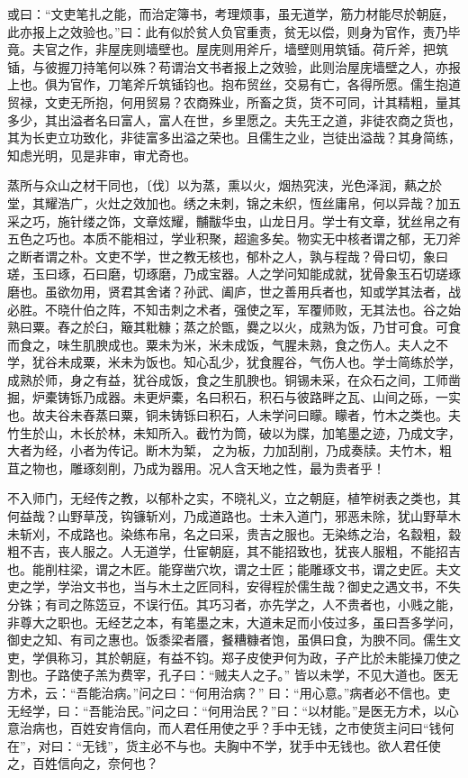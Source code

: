 \documentclass[]{article}
\begin{document}
或曰：``文吏笔扎之能，而治定簿书，考理烦事，虽无道学，筋力材能尽於朝庭，此亦报上之效验也。''曰：此有似於贫人负官重责，贫无以偿，则身为官作，责乃毕竟。夫官之作，非屋庑则墙壁也。屋庑则用斧斤，墙壁则用筑锸。荷斤斧，把筑锸，与彼握刀持笔何以殊？苟谓治文书者报上之效验，此则治屋庑墙壁之人，亦报上也。俱为官作，刀笔斧斤筑锸钧也。抱布贸丝，交易有亡，各得所愿。儒生抱道贸禄，文吏无所抱，何用贸易？农商殊业，所畜之货，货不可同，计其精粗，量其多少，其出溢者名曰富人，富人在世，乡里愿之。夫先王之道，非徒农商之货也，其为长吏立功致化，非徒富多出溢之荣也。且儒生之业，岂徒出溢哉？其身简练，知虑光明，见是非审，审尤奇也。

蒸所与众山之材干同也，〔伐〕以为蒸，熏以火，烟热究浃，光色泽润，爇之於堂，其耀浩广，火灶之效加也。绣之未刺，锦之未织，恆丝庸帛，何以异哉？加五采之巧，施针缕之饰，文章炫耀，黼黻华虫，山龙日月。学士有文章，犹丝帛之有五色之巧也。本质不能相过，学业积聚，超逾多矣。物实无中核者谓之郁，无刀斧之断者谓之朴。文吏不学，世之教无核也，郁朴之人，孰与程哉？骨曰切，象曰瑳，玉曰琢，石曰磨，切琢磨，乃成宝器。人之学问知能成就，犹骨象玉石切瑳琢磨也。虽欲勿用，贤君其舍诸？孙武、阖庐，世之善用兵者也，知或学其法者，战必胜。不晓什伯之阵，不知击刺之术者，强使之军，军覆师败，无其法也。谷之始熟曰粟。舂之於臼，簸其粃糠；蒸之於甑，爨之以火，成熟为饭，乃甘可食。可食而食之，味生肌腴成也。粟未为米，米未成饭，气腥未熟，食之伤人。夫人之不学，犹谷未成粟，米未为饭也。知心乱少，犹食腥谷，气伤人也。学士简练於学，成熟於师，身之有益，犹谷成饭，食之生肌腴也。铜锡未采，在众石之间，工师凿掘，炉橐铸铄乃成器。未更炉橐，名曰积石，积石与彼路畔之瓦、山间之砾，一实也。故夫谷未舂蒸曰粟，铜未铸铄曰积石，人未学问曰矇。矇者，竹木之类也。夫竹生於山，木长於林，未知所入。截竹为筒，破以为牒，加笔墨之迹，乃成文字，大者为经，小者为传记。断木为椠，之为板，力加刮削，乃成奏牍。夫竹木，粗苴之物也，雕琢刻削，乃成为器用。况人含天地之性，最为贵者乎！

不入师门，无经传之教，以郁朴之实，不晓礼义，立之朝庭，植笮树表之类也，其何益哉？山野草茂，钩镰斩刈，乃成道路也。士未入道门，邪恶未除，犹山野草木未斩刈，不成路也。染练布帛，名之曰采，贵吉之服也。无染练之治，名縠粗，縠粗不吉，丧人服之。人无道学，仕宦朝庭，其不能招致也，犹丧人服粗，不能招吉也。能削柱梁，谓之木匠。能穿凿穴坎，谓之士匠；能雕琢文书，谓之史匠。夫文吏之学，学治文书也，当与木土之匠同科，安得程於儒生哉？御史之遇文书，不失分铢；有司之陈笾豆，不误行伍。其巧习者，亦先学之，人不贵者也，小贱之能，非尊大之职也。无经艺之本，有笔墨之末，大道未足而小伎过多，虽曰吾多学问，御史之知、有司之惠也。饭黍梁者餍，餐糟糠者饱，虽俱曰食，为腴不同。儒生文吏，学俱称习，其於朝庭，有益不钧。郑子皮使尹何为政，子产比於未能操刀使之割也。子路使子羔为费宰，孔子曰：``贼夫人之子。''
皆以未学，不见大道也。医无方术，云：``吾能治病。''问之曰：``何用治病？''
曰：``用心意。''病者必不信也。吏无经学，曰：``吾能治民。''问之曰：``何用治民？''曰：``以材能。''是医无方术，以心意治病也，百姓安肯信向，而人君任用使之乎？手中无钱，之市使货主问曰``钱何在''，对曰：``无钱''，货主必不与也。夫胸中不学，犹手中无钱也。欲人君任使之，百姓信向之，奈何也？
\end{document}
